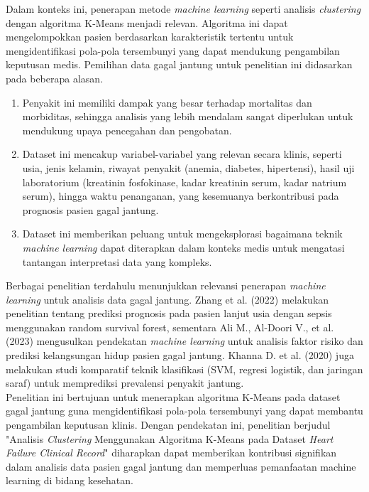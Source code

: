 \documentclass[english,12pt,a4paper,openany]{book}
\begin{document}
	Dalam konteks ini, penerapan metode \textit{machine learning} seperti analisis \textit{clustering} dengan algoritma K-Means menjadi relevan. Algoritma ini dapat mengelompokkan pasien berdasarkan karakteristik tertentu untuk mengidentifikasi pola-pola tersembunyi yang dapat mendukung pengambilan keputusan medis. Pemilihan data gagal jantung untuk penelitian ini didasarkan pada beberapa alasan.
	\begin{enumerate}
		\item Penyakit ini memiliki dampak yang besar terhadap mortalitas dan morbiditas, sehingga analisis yang lebih mendalam sangat diperlukan untuk mendukung upaya pencegahan dan pengobatan. 
		\item Dataset ini mencakup variabel-variabel yang relevan secara klinis, seperti usia, jenis kelamin, riwayat penyakit (anemia, diabetes, hipertensi), hasil uji laboratorium (kreatinin fosfokinase, kadar kreatinin serum, kadar natrium serum), hingga waktu penanganan, yang kesemuanya berkontribusi pada prognosis pasien gagal jantung. 
		\item Dataset ini memberikan peluang untuk mengeksplorasi bagaimana teknik \textit{machine learning} dapat diterapkan dalam konteks medis untuk mengatasi tantangan interpretasi data yang kompleks. 
	\end{enumerate}  
	
	Berbagai penelitian terdahulu menunjukkan relevansi penerapan \textit{machine learning} untuk analisis data gagal jantung. Zhang et al. (2022) melakukan penelitian tentang prediksi prognosis pada pasien lanjut usia dengan sepsis menggunakan random survival forest, sementara Ali M., Al-Doori V., et al. (2023) mengusulkan pendekatan \textit{machine learning} untuk analisis faktor risiko dan prediksi kelangsungan hidup pasien gagal jantung. Khanna D. et al. (2020) juga melakukan studi komparatif teknik klasifikasi (SVM, regresi logistik, dan jaringan saraf) untuk memprediksi prevalensi penyakit jantung.\\ 
	
	Penelitian ini bertujuan untuk menerapkan algoritma K-Means pada dataset gagal jantung guna mengidentifikasi pola-pola tersembunyi yang dapat membantu pengambilan keputusan klinis. Dengan pendekatan ini, penelitian berjudul "Analisis \textit{Clustering} Menggunakan Algoritma K-Means pada Dataset \textit{Heart Failure Clinical Record}" diharapkan dapat memberikan kontribusi signifikan dalam analisis data pasien gagal jantung dan memperluas pemanfaatan machine learning di bidang kesehatan. \\
	
\end{document}
